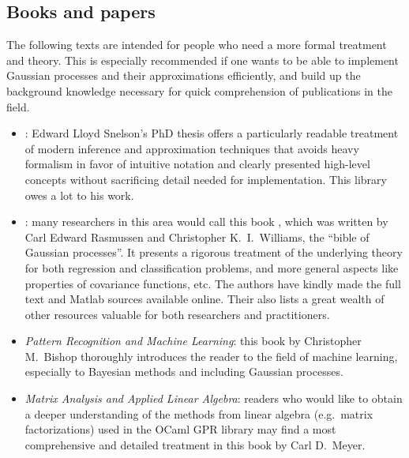 \documentclass[10pt]{report}
\begin{document}
\subsection{Books and papers}

The following texts are intended for people who need a more formal treatment and
theory.  This is especially recommended if one wants to be able to implement
Gaussian processes and their approximations efficiently, and build up the
background knowledge necessary for quick comprehension of publications in the
field.

\begin{itemize}

\item
\emph{}: Edward Lloyd
Snelson's PhD thesis \cite{SnelsonThesis} offers a particularly readable
treatment of modern inference and approximation techniques that avoids heavy
formalism in favor of intuitive notation and clearly presented high-level
concepts without sacrificing detail needed for implementation.  This library
owes a lot to his work.

\item \emph{}: many researchers in this area would call this book
\cite{oai:eprints.pascal-network.org:1211}, which was written by Carl Edward
Rasmussen and Christopher K.\ I.\ Williams, the ``bible of Gaussian processes''.
It presents a rigorous treatment of the underlying theory for both regression
and classification problems, and more general aspects like properties of
covariance functions, etc.  The authors have kindly made the full text and
Matlab sources available online.  Their
 also lists
a great wealth of other resources valuable for both researchers and
practitioners.

\item \emph{Pattern Recognition and Machine Learning}: this book
\cite{BishopMachLearn} by Christopher M.\ Bishop thoroughly introduces the
reader to the field of machine learning, especially to Bayesian methods and
including Gaussian processes.

\item \emph{Matrix Analysis and Applied Linear Algebra}: readers who would like
to obtain a deeper understanding of the methods from linear algebra (e.g.\
matrix factorizations) used in the OCaml GPR library may find a most comprehensive and
detailed treatment in this book \cite{MatrixAnalysis} by Carl D.\ Meyer.

\end{itemize}
\end{document}
